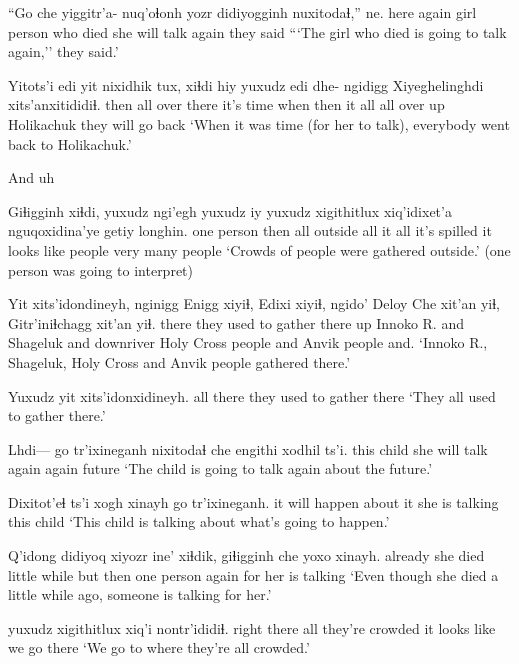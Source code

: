 \documentclass[12pt]{article}
\begin{document}
\gll ``Go   che yiggitr'a- {nuq'oɬonh yozr} didiyogginh nuxitodaɬ,'' ne. 
here again {}       girl {person who died} {she will talk again} {they said}
\glt ```The girl who died is going to talk again,'' they said.'
\glend

\gll Yitots'i edi      yit   nixidhik tux, xiɬdi hiy yuxudz edi       dhe- ngidigg Xiyeghelinghdi xits'anxitididiɬ. 
then    {all over} there {it's time} when then it  all  {all over} {}    up      Holikachuk {they will go back}
\glt `When it was time (for her to talk), everybody went back to Holikachuk.'
\glend

And uh

\gll Giɬigginh   xiɬdi, yuxudz ngi'egh yuxudz iy yuxudz xigithitlux  xiq'idixet'a     nguqoxidina'ye getiy longhin.
{one person} then  all    outside all     it  all    {it's spilled} {it looks like} people         very  {many people}
\glt `Crowds of people were gathered outside.' (one person was going to interpret)
\glend

 Yit   xits'idondineyh, nginigg Enigg xiyiɬ, Edixi    xiyiɬ, ngido' {Deloy Che xit'an} yiɬ, Gitr'iniɬchagg xit'an yiɬ.
{} there {they used to gather there} up {Innoko R.}     and   Shageluk and   downriver {Holy Cross people}  and Anvik people and.
\glt `Innoko R., Shageluk, Holy Cross and Anvik people gathered there.'
\glend

\gll Yuxudz yit xits'idonxidineyh.
all there {they used to gather there}
\glt `They all used to gather there.'
\glend

\gll Lhdi--- go tr'ixineganh nixitodaɬ           che   {engithi xodhil ts'i}. 
{}    this child      {she will talk again} again {future}
\glt `The child is going to talk again about the future.'
\glend

\gll Dixitot'eɬ ts'i xogh xinayh go tr'ixineganh. 
{it will happen} {} {about it} {she is talking} this child
\glt `This child is talking about what's going to happen.'
\glend

\gll Q'idong didiyoq   {xiyozr} ine'  xiɬdik,  giɬigginh che yoxo xinayh.
already {she died} {little while} but then {one person} again {for her} {is talking}
\glt `Even though she died a little while ago, someone is talking for her.'
\glend

 yuxudz xigithitlux     xiq'i         nontr'ididiɬ.
{right there}     all    {they're crowded} {it looks like} {we go there}
\glt `We go to where they're all crowded.' 
\glend
\end{document}
